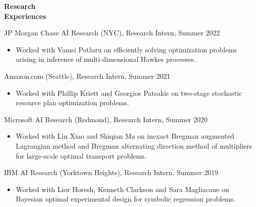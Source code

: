 \documentclass[11pt]{article}
\begin{document}
\begin{minipage}[t]{0.18\textwidth}
\textbf{Research\\ Experiences}
\end{minipage}\hfill
\begin{minipage}[t]{0.8\textwidth}

JP Morgan Chase AI Research (NYC), {Research Intern}, Summer 2022
\begin{itemize}
\item Worked with Vamsi Potluru on efficiently solving optimization problems arising in %
inference of multi-dimensional Hawkes processes. 
\end{itemize}

Amazon.com (Seattle), {Research Intern}, Summer 2021
\begin{itemize}
\item Worked with Phillip Kriett and Georgios Patsakis on two-stage stochastic resource plan optimization problems. 
\end{itemize}

Microsoft AI Research (Redmond), {Research Intern}, Summer 2020
\begin{itemize}
\item Worked with Lin Xiao and Shiqian Ma on inexact Bregman augmented Lagrangian method and Bregman alternating direction method of multipliers for large-scale optimal transport problems. 
\end{itemize}

IBM AI Research (Yorktown Heights), {Research Intern}, Summer 2019%
\begin{itemize}
\item Worked with Lior Horesh, Kenneth Clarkson and Sara Magliacane on Bayesian optimal experimental design for symbolic regression problems.
\end{itemize}

\end{minipage}

\newpage



\end{document}
